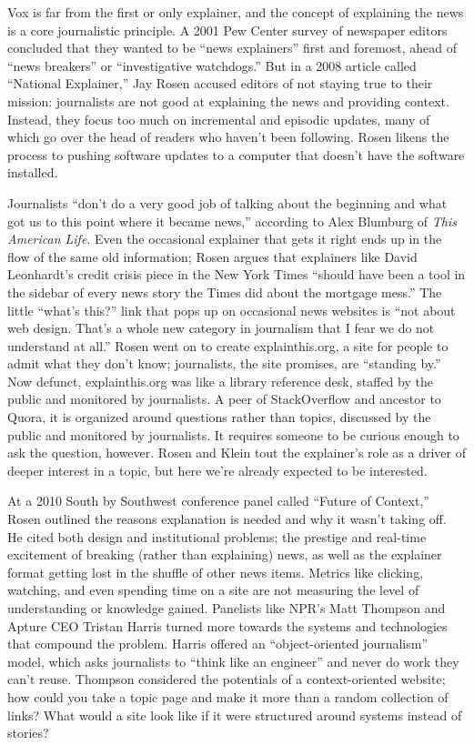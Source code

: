 Vox is far from the first or only explainer, and the concept of explaining the news is a core journalistic principle. A 2001 Pew Center survey of newspaper editors concluded that they wanted to be ``news explainers'' first and foremost, ahead of ``news breakers'' or ``investigative watchdogs.''\autocite{????_journalism_2001} But in a 2008 article called ``National Explainer,'' Jay Rosen accused editors of not staying true to their mission: journalists are not good at explaining the news and providing context.\autocite{rosen_national_2008} Instead, they focus too much on incremental and episodic updates, many of which go over the head of readers who haven't been following. Rosen likens the process to pushing software updates to a computer that doesn't have the software installed.

Journalists ``don't do a very good job of talking about the beginning and what got us to this point where it became news,'' according to Alex Blumburg of \emph{This American Life}.\autocite{rosen_national_2008} Even the occasional explainer that gets it right ends up in the flow of the same old information; Rosen argues that explainers like David Leonhardt's credit crisis piece in the New York Times ``should have been a tool in the sidebar of every news story the Times did about the mortgage mess.'' The little ``what's this?'' link that pops up on occasional news websites is ``not about web design. That's a whole new category in journalism that I fear we do not understand at all.'' Rosen went on to create explainthis.org, a site for people to admit what they don't know; journalists, the site promises, are ``standing by.''\autocite{????_explainthis.org_2010} Now defunct, explainthis.org was like a library reference desk, staffed by the public and monitored by journalists. A peer of StackOverflow and ancestor to Quora, it is organized around questions rather than topics, discussed by the public and monitored by journalists. It requires someone to be curious enough to ask the question, however. Rosen and Klein tout the explainer's role as a driver of deeper interest in a topic, but here we're already expected to be interested.

At a 2010 South by Southwest conference panel called ``Future of Context,'' Rosen outlined the reasons explanation is needed and why it wasn't taking off. He cited both design and institutional problems; the prestige and real-time excitement of breaking (rather than explaining) news, as well as the explainer format getting lost in the shuffle of other news items.\autocite{rosen_news_2010} Metrics like clicking, watching, and even spending time on a site are not measuring the level of understanding or knowledge gained. Panelists like NPR's Matt Thompson and Apture CEO Tristan Harris turned more towards the systems and technologies that compound the problem. Harris offered an ``object-oriented journalism'' model, which asks journalists to ``think like an engineer'' and never do work they can't reuse. Thompson considered the potentials of a context-oriented website; how could you take a topic page and make it more than a random collection of links? What would a site look like if it were structured around systems instead of stories?\autocite{rosen_news_2010,myers_liveblogging_2010,hu_contextualizing_2010}

